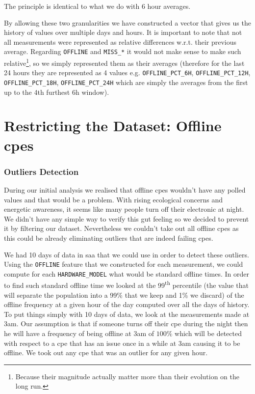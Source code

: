The principle is identical to what we do with 6 hour averages.

By allowing these two granularities we have constructed a vector that gives us the history of values over multiple days and hours. It is important to note that not all measurements were represented as relative differences w.r.t. their previous average. Regarding \texttt{OFFLINE} and \texttt{MISS\_*} it would not make sense to make such relative\footnote{Because their magnitude actually matter more than their evolution on the long run.}, so we simply represented them as their averages (therefore for the last 24 hours they are represented as 4 values e.g. \texttt{OFFLINE\_PCT\_6H}, \texttt{OFFLINE\_PCT\_12H}, \texttt{OFFLINE\_PCT\_18H}, \texttt{OFFLINE\_PCT\_24H} which are simply the averages from the first up to the 4th furthest 6h window).

\section{Restricting the Dataset: Offline \acrshort{cpe}s}
\subsubsection{Outliers Detection}
During our initial analysis we realised that offline \acrshort{cpe}s wouldn't have any polled values and that would be a problem. With rising ecological concerns and energetic awareness, it seems like many people turn off their electronic at night. We didn't have any simple way to verify this gut feeling so we decided to prevent it by filtering our dataset. Nevertheless we couldn't take out all offline \acrshort{cpe}s as this could be already eliminating outliers that are indeed failing \acrshort{cpe}s. 

We had 10 days of data in \acrshort{saa} that we could use in order to detect these outliers. Using the \texttt{OFFLINE} feature that we constructed for each measurement, we could compute for each \texttt{HARDWARE\_MODEL} what would be standard offline times. In order to find such standard offline time we looked at the 99\textsuperscript{th} percentile (the value that will separate the population into a 99\% that we keep and 1\% we discard) of the offline frequency at a given hour of the day computed over all the days of history. To put things simply with 10 days of data, we look at the measurements made at 3am. Our assumption is that if someone turns off their \acrshort{cpe} during the night then he will have a frequency of being offline at 3am of $100\%$ which will be detected with respect to a \acrshort{cpe} that has an issue once in a while at 3am causing it to be offline. We took out any \acrshort{cpe} that was an outlier for any given hour. 

